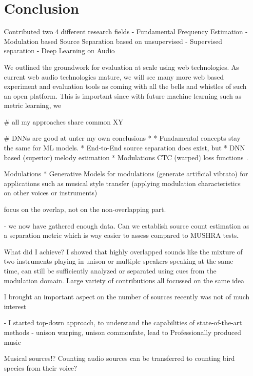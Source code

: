 \chapter{Conclusion}


Contributed two 4 different research fields
- Fundamental Frequency Estimation
- Modulation based Source Separation based on unsupervised
- Supervised separation
- Deep Learning on Audio


We outlined the groundwork for evaluation at scale using web technologies. As current web audio technologies mature, we will see many more web based experiment and evaluation tools as coming with all the bells and whistles of such an open platform.
This is important since with future machine learning such as metric learning, we 

# all my approaches share common XY

# DNNs are good at unter
my own conclusions
* 
* Fundamental concepts stay the same for ML models. 
* End-to-End source separation does exist, but 
* DNN based (superior) melody estimation
* Modulations CTC (warped) loss functions~\cite{graves06}.

Modulations
* Generative Models for modulations (generate artificial vibrato) for applications such as musical style transfer (applying modulation characteristics on other voices or instruments)



focus on the overlap, not on the non-overlapping part.


- we now have gathered enough data. Can we establish source count estimation as a separation metric which is way easier to assess compared to MUSHRA tests.

 What did I achieve?
I showed that highly overlapped sounds like the mixture of two instruments playing in unison or multiple speakers speaking at the same time, can still be sufficiently analyzed or separated using cues from the modulation domain. 
Large variety of contributions all focussed on the same idea

I brought an important aspect on the number of sources recently was not of much interest

- I started top-down approach, to understand the capabilities of state-of-the-art methods
- unison warping, unison commonfate, lead to Professionally produced music

Musical sources!?
Counting audio sources can be transferred to counting bird species from their voice?

